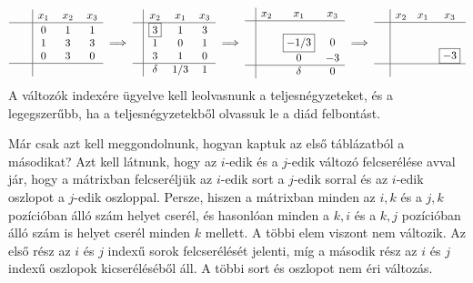\documentclass[9pt, a4paper, showtrims]{memoir}
\theoremstyle{plain}
\theoremstyle{remark}
\theoremstyle{definition}
\begin{document}
\[
\begin{array}{c|ccc}
     & x_1       & x_2 & x_3 \\
     \hline
     \phantom{\boxed{3}} & 0 & 1   & 1   \\
     & 1 & 3   & 3   \\
     & 0 & 3   & 0   \\
    \hline
    & \phantom{\delta}     &\phantom{1/3}    &\phantom{1}
\end{array}
\implies
\begin{array}{c|ccc}
     & x_2       & x_1 & x_3 \\
     \hline
     & \boxed{3} & 1   & 3   \\
     & 1         & 0   & 1   \\
     & 3         & 1   & 0   \\
    \hline
    & \delta     & 1/3   & 1 
\end{array}
\implies
\begin{array}{c|ccc}
     & x_2& x_1  & x_3 \\
     \hline
     & &                &     \\
     & & \boxed{-1/3}      & 0   \\
     & & 0              & -3   \\
     \hline
     & & \delta         & 0
\end{array}
\implies
\begin{array}{c|ccc}
     & x_2 & x_1 & x_3      \\
     \hline
     &     &     &          \\
     &     &     &          \\
     &     &     & \boxed{-3}\\
    \hline
    \phantom{\delta}
\end{array}
\]
A változók indexére ügyelve kell leolvasnunk a teljesnégyzeteket, és a legegszerűbb, ha a teljesnégyzetekből olvassuk le a diád felbontást.

Már csak azt kell meggondolnunk, hogyan kaptuk az első táblázatból a másodikat?
Azt kell látnunk, hogy az $i$-edik és a $j$-edik változó felcserélése avval jár, 
hogy a mátrixban felcseréljük az $i$-edik sort a $j$-edik sorral és az $i$-edik oszlopot a $j$-edik oszloppal.
Persze, hiszen a mátrixban minden az $i,k$ és a $j,k$ pozícióban álló szám helyet cserél, 
és hasonlóan minden a $k,i$ és a $k,j$ pozícióban álló szám is helyet cserél minden $k$ mellett.
A többi elem viszont nem változik.
Az első rész az $i$ és $j$ indexű sorok felcserélését jelenti, míg a második rész az $i$ és $j$ indexű oszlopok kicseréléséből áll.
A többi sort és oszlopot nem éri változás.
\end{document}
